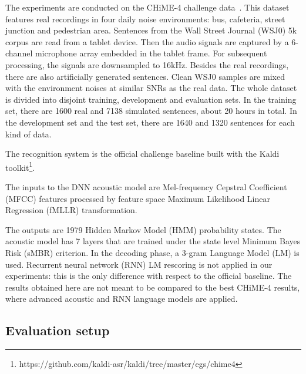 \documentclass[review]{elsarticle}
\newif\ifproofread
\newcommand{\pfmarker}[1]{%
\ifproofread
\textcolor{red}{#1}%
\else
#1%
\fi
}
\begin{document}
The experiments are conducted on the CHiME-4 challenge data~\cite{2016chime4}. This dataset features real recordings in four daily noise environments: bus, cafeteria, street junction and pedestrian area. Sentences from the Wall Street Journal (WSJ0) 5k corpus are read from a tablet device. Then the audio signals are captured by a 6-channel microphone array embedded in the tablet frame. For subsequent processing, the signals are downsampled to 16kHz. Besides the real recordings, there are also artificially generated sentences. Clean WSJ0 samples are mixed with the environment noises at similar SNRs as the real data. The whole dataset is divided into disjoint training, development and evaluation sets. In the training set, there are 1600 real and 7138 simulated sentences, about 20 hours in total. In the development set and the test set, there are 1640 and 1320 sentences for each kind of data.

The recognition system is the official challenge baseline built with the Kaldi toolkit\footnote{https://github.com/kaldi-asr/kaldi/tree/master/egs/chime4}. \pfmarker{The inputs to the DNN acoustic model are Mel-frequency Cepstral Coefficient (MFCC) features processed by feature space Maximum Likelihood Linear Regression (fMLLR) transformation.} The outputs are 1979 Hidden Markov Model (HMM) probability states. The acoustic model has 7 layers that are trained under the state level Minimum Bayes Risk (sMBR) criterion. In the decoding phase, a 3-gram Language Model (LM) is used. Recurrent neural network (RNN) LM rescoring is not applied in our experiments: this is the only difference with respect to the official baseline. The results obtained here are not meant to be compared to the best CHiME-4 results, where advanced acoustic and RNN language models are applied.


\subsection{Evaluation setup}
\end{document}
